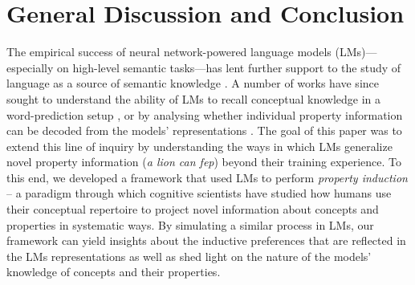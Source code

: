 \documentclass[10pt,letterpaper]{article}
\newcommand{\km}[1]{\textcolor{purple}{$_{KM}$[#1]}}
\begin{document}
\section{General Discussion and Conclusion}
The empirical success of neural network-powered language models (LMs)---especially on high-level semantic tasks---has lent further support to the study of language as a source of semantic knowledge \citep{elman1990finding, lupyan2019words}.
A number of works have since sought to understand the ability of LMs to recall conceptual knowledge in a word-prediction setup \citep{petroni2019language, weir2020probing, misra2021typicality}, or by analysing whether individual property information can be decoded from the models' representations \citep{lucy-gauthier-2017-distributional, forbes2019neural, bhatia2020transformer}.
The goal of this paper was to extend this line of inquiry by understanding the ways in which LMs generalize novel property information (\textit{a lion can fep}) beyond their training experience.
To this end, we developed a framework that used LMs to perform \textit{property induction} -- a paradigm through which cognitive scientists have studied how humans use their conceptual repertoire to project novel information about concepts and properties in systematic ways.
By simulating a similar process in LMs, our framework can yield insights about the inductive preferences that are reflected in the LMs representations as well as shed light on the nature of the models' knowledge of concepts and their properties.
\end{document}
